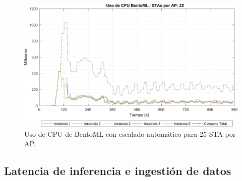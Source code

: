 \begin{figure}[ht!]
    \centering
    \includegraphics[width=\textwidth]{fig/08_datadriven/datadriven_11.pdf}
    \caption{Uso de CPU de BentoML con escalado automático para 25 STA por AP.}
    \label{fig:time_advance_consumption_stas25__ns_bentoml_datadriven}
\end{figure}

\subsection{Latencia de inferencia e ingestión de datos}

